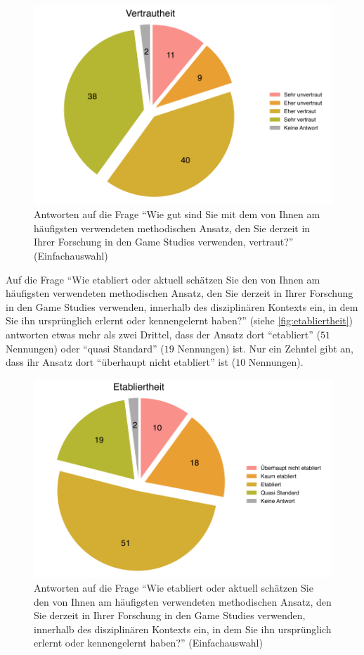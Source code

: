 \documentclass{scrartcl}
\begin{document}
\begin{figure}[t]
   \includegraphics[width=1\textwidth]{vertrautheit.pdf}
   \caption{Antworten auf die Frage \enquote{Wie gut sind Sie mit dem von Ihnen am häufigsten verwendeten methodischen Ansatz, den Sie derzeit in Ihrer Forschung in den Game Studies verwenden, vertraut?} (Einfachauswahl)}
   \label{fig:vertrautheit}
\end{figure}

Auf die Frage \enquote{Wie etabliert oder aktuell schätzen Sie den von Ihnen am häufigsten verwendeten methodischen Ansatz, den Sie derzeit in Ihrer Forschung in den Game Studies verwenden, innerhalb des disziplinären Kontexts ein, in dem Sie ihn ursprünglich erlernt oder kennengelernt haben?} (siehe \autoref{fig:etabliertheit}) antworten etwas mehr als zwei Drittel, dass der Ansatz dort \enquote{etabliert} ($51$ Nennungen) oder \enquote{quasi Standard} ($19$ Nennungen) ist.
Nur ein Zehntel gibt an, dass ihr Ansatz dort \enquote{überhaupt nicht etabliert} ist ($10$ Nennungen).

\begin{figure}[t]
   \includegraphics[width=1\textwidth]{etabliertheit.pdf}
   \caption{Antworten auf die Frage \enquote{Wie etabliert oder aktuell schätzen Sie den von Ihnen am häufigsten verwendeten methodischen Ansatz, den Sie derzeit in Ihrer Forschung in den Game Studies verwenden, innerhalb des disziplinären Kontexts ein, in dem Sie ihn ursprünglich erlernt oder kennengelernt haben?} (Einfachauswahl)}
   \label{fig:etabliertheit}
\end{figure}
\end{document}
